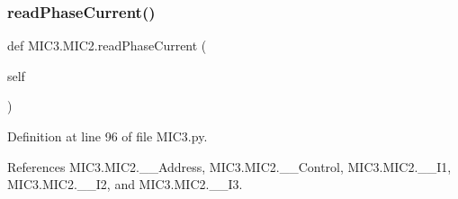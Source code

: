 \mbox{\label{class_m_i_c3_1_1_m_i_c2_a28cc6d8bef6e4861272cc9a3398d3833}} 
\subsubsection{\texorpdfstring{read\+Phase\+Current()}{readPhaseCurrent()}}
{\footnotesize\ttfamily def M\+I\+C3.\+M\+I\+C2.\+read\+Phase\+Current (\begin{DoxyParamCaption}\item[{}]{self }\end{DoxyParamCaption})}



Definition at line 96 of file M\+I\+C3.\+py.



References M\+I\+C3.\+M\+I\+C2.\+\_\+\+\_\+\+Address, M\+I\+C3.\+M\+I\+C2.\+\_\+\+\_\+\+Control, M\+I\+C3.\+M\+I\+C2.\+\_\+\+\_\+\+I1, M\+I\+C3.\+M\+I\+C2.\+\_\+\+\_\+\+I2, and M\+I\+C3.\+M\+I\+C2.\+\_\+\+\_\+\+I3.


